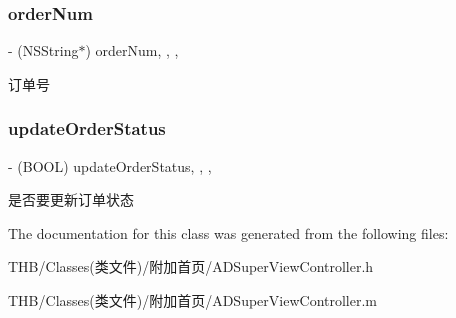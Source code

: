 \subsubsection{\texorpdfstring{order\+Num}{orderNum}}
{\footnotesize\ttfamily -\/ (N\+S\+String$\ast$) order\+Num\hspace{0.3cm}{\ttfamily [read]}, {\ttfamily [write]}, {\ttfamily [nonatomic]}, {\ttfamily [strong]}}

订单号 \mbox{\label{interface_a_d_super_view_controller_a8c7ad181e8405cfac84a53ae5c44d987}} 
\subsubsection{\texorpdfstring{update\+Order\+Status}{updateOrderStatus}}
{\footnotesize\ttfamily -\/ (B\+O\+OL) update\+Order\+Status\hspace{0.3cm}{\ttfamily [read]}, {\ttfamily [write]}, {\ttfamily [nonatomic]}, {\ttfamily [assign]}}

是否要更新订单状态 

The documentation for this class was generated from the following files\+:\begin{DoxyCompactItemize}
\item 
T\+H\+B/\+Classes(类文件)/附加首页/A\+D\+Super\+View\+Controller.\+h\item 
T\+H\+B/\+Classes(类文件)/附加首页/A\+D\+Super\+View\+Controller.\+m\end{DoxyCompactItemize}
